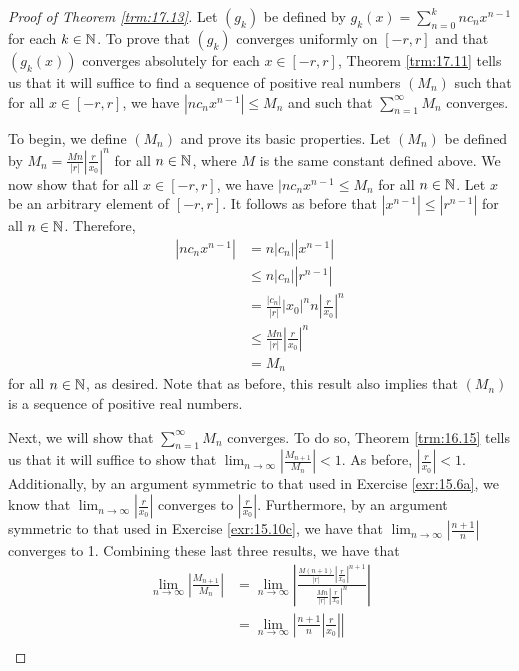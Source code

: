 \documentclass[../main.tex]{subfiles}
\begin{document}
\begin{theorem}
\begin{proof}[Proof of Theorem \ref{trm:17.13}]
        Let $(g_k)$ be defined by $g_k(x)=\sum_{n=0}^knc_nx^{n-1}$ for each $k\in\mathbb{N}$. To prove that $(g_k)$ converges uniformly on $[-r,r]$ and that $(g_k(x))$ converges absolutely for each $x\in[-r,r]$, Theorem \ref{trm:17.11} tells us that it will suffice to find a sequence of positive real numbers $(M_n)$ such that for all $x\in[-r,r]$, we have $|nc_nx^{n-1}|\leq M_n$ and such that $\sum_{n=1}^\infty M_n$ converges.\par\smallskip
        To begin, we define $(M_n)$ and prove its basic properties. Let $(M_n)$ be defined by $M_n=\frac{Mn}{|r|}|\frac{r}{x_0}|^n$ for all $n\in\mathbb{N}$, where $M$ is the same constant defined above. We now show that for all $x\in[-r,r]$, we have $|nc_nx^{n-1}\leq M_n$ for all $n\in\mathbb{N}$. Let $x$ be an arbitrary element of $[-r,r]$. It follows as before that $|x^{n-1}|\leq|r^{n-1}|$ for all $n\in\mathbb{N}$. Therefore,
        \begin{align*}
            |nc_nx^{n-1}| &= n|c_n||x^{n-1}|\\
            &\leq n|c_n||r^{n-1}|\\
            &= \frac{|c_n|}{|r|}|x_0|^nn\left| \frac{r}{x_0} \right|^n\\
            &\leq \frac{Mn}{|r|}\left| \frac{r}{x_0} \right|^n\\
            &= M_n
        \end{align*}
        for all $n\in\mathbb{N}$, as desired. Note that as before, this result also implies that $(M_n)$ is a sequence of positive real numbers.\par
        Next, we will show that $\sum_{n=1}^\infty M_n$ converges. To do so, Theorem \ref{trm:16.15} tells us that it will suffice to show that $\lim_{n\to\infty}|\frac{M_{n+1}}{M_n}|<1$. As before, $|\frac{r}{x_0}|<1$. Additionally, by an argument symmetric to that used in Exercise \ref{exr:15.6a}, we know that $\lim_{n\to\infty}|\frac{r}{x_0}|$ converges to $|\frac{r}{x_0}|$. Furthermore, by an argument symmetric to that used in Exercise \ref{exr:15.10c}, we have that $\lim_{n\to\infty}|\frac{n+1}{n}|$ converges to 1. Combining these last three results, we have that
        \begin{align*}
            \lim_{n\to\infty}\left| \frac{M_{n+1}}{M_n} \right| &= \lim_{n\to\infty}\left| \frac{\frac{M(n+1)}{|r|}\left| \frac{r}{x_0} \right|^{n+1}}{\frac{Mn}{|r|}\left| \frac{r}{x_0} \right|^n} \right|\\
            &= \lim_{n\to\infty}\left| \frac{n+1}{n}\left| \frac{r}{x_0} \right| \right|\\

\end{align*}
\end{proof}
\end{theorem}
\end{document}
